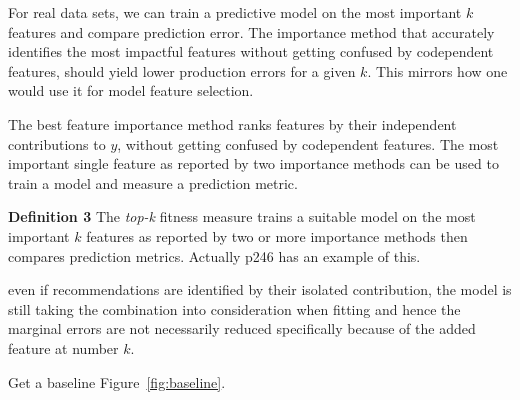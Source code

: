 \documentclass[twoside,11pt]{article}
\newcommand{\figref}[1]{Figure~\ref{#1}}
\begin{document}
For real data sets, we can train a predictive model on the most important $k$ features and compare prediction error. The importance method that accurately identifies the most impactful features without getting confused by codependent features, should yield lower production errors for a given $k$.   This mirrors how one would use it for model feature selection.
 
The best feature importance method ranks features by their independent contributions to $y$, without getting confused by codependent features. The most important single feature as reported by two importance methods can be used to train a model and measure a prediction metric.
 
{\bf Definition 3} The {\em top-k} fitness measure trains a suitable model on the  most important $k$ features as reported by two or more importance methods then compares prediction metrics. Actually p246 \cite{liu-fs} has an example of this.

even if recommendations are identified by their isolated contribution, the model is still taking the combination into consideration when fitting and hence the marginal errors are not necessarily reduced specifically because of the added feature at number $k$.

Get a baseline \figref{fig:baseline}.
\end{document}
